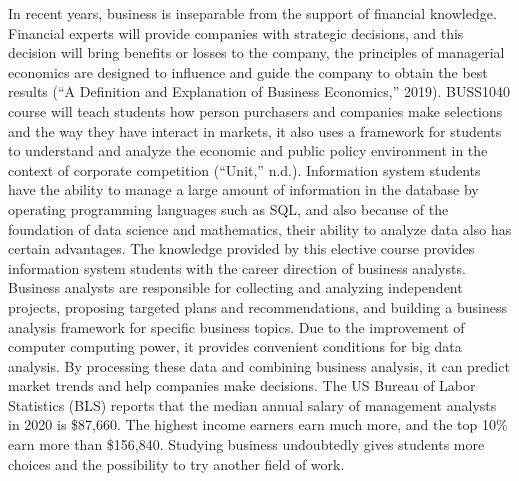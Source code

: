 \documentclass[12pt]{article}
\begin{document}
In recent years, business is inseparable from the support of financial knowledge. Financial experts will provide companies with strategic decisions, and this decision will bring benefits or losses to the company, the principles of managerial economics are designed to influence and guide the company to obtain the best results (“A Definition and Explanation of Business Economics,” 2019). BUSS1040 course will teach students how person purchasers and companies make selections and the way they have interact in markets, it also uses a framework for students to understand and analyze the economic and public policy environment in the context of corporate competition (“Unit,” n.d.). Information system students have the ability to manage a large amount of information in the database by operating programming languages such as SQL, and also because of the foundation of data science and mathematics, their ability to analyze data also has certain advantages. The knowledge provided by this elective course provides information system students with the career direction of business analysts. Business analysts are responsible for collecting and analyzing independent projects, proposing targeted plans and recommendations, and building a business analysis framework for specific business topics. Due to the improvement of computer computing power, it provides convenient conditions for big data analysis. By processing these data and combining business analysis, it can predict market trends and help companies make decisions. The US Bureau of Labor Statistics (BLS) reports that the median annual salary of management analysts in 2020 is \$87,660. The highest income earners earn much more, and the top 10\% earn more than \$156,840. Studying business undoubtedly gives students more choices and the possibility to try another field of work.
\end{document}
